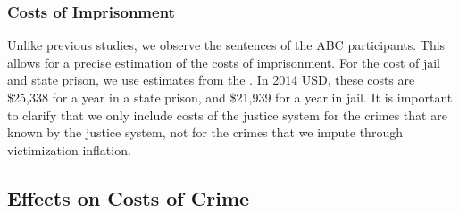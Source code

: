 \subsubsection{Costs of Imprisonment}
\noindent Unlike previous studies, we observe the sentences of the ABC participants. This allows for a precise estimation of the costs of imprisonment. For the cost of jail and state prison, we use estimates from the \citet{US-Justice_1988_Report-Crime-Justice}. In 2014 USD, these costs are \$25,338 for a year in a state prison, and \$21,939 for a year in jail.
It is important to clarify that we only include costs of the justice system for the crimes that are known by the justice system, not for the crimes that we impute through victimization inflation. \\

\subsection{Effects on Costs of Crime}



